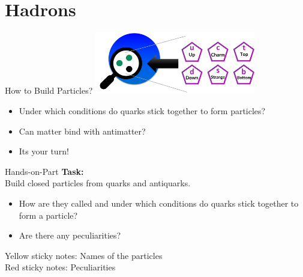 \section{Hadrons}

\begin{frame}{How to Build Particles?}
    \centering
    \includegraphics[width=7cm]{Figures Lecture on Hadrons/Scale Atom_Quark_downup-approach_Hadron.png}
\begin{itemize}
    \item Under which conditions do quarks stick together to form particles?
    \item Can matter bind with antimatter?%
    \item[\ding{43}] Its your turn!
\end{itemize}
\end{frame}

\newcommand\squareF{\raisebox{-2mm}{\scalebox{3}{\ding{110}}}}
\begin{frame}{Hands-on-Part}
\textbf{Task:}\\ Build closed particles from quarks and antiquarks. \\ \begin{itemize}
    \item[] How are they called and under which conditions do quarks stick together to form a particle?
    \item[] Are there any peculiarities?
    \end{itemize}
\vspace{1cm}
\textcolor{yellow}{\squareF} \hspace{-0.525cm} Yellow sticky notes: Names of the particles\\
\textcolor{red}{\squareF} \hspace{-0.525cm} Red sticky notes: Peculiarities
\end{frame}
